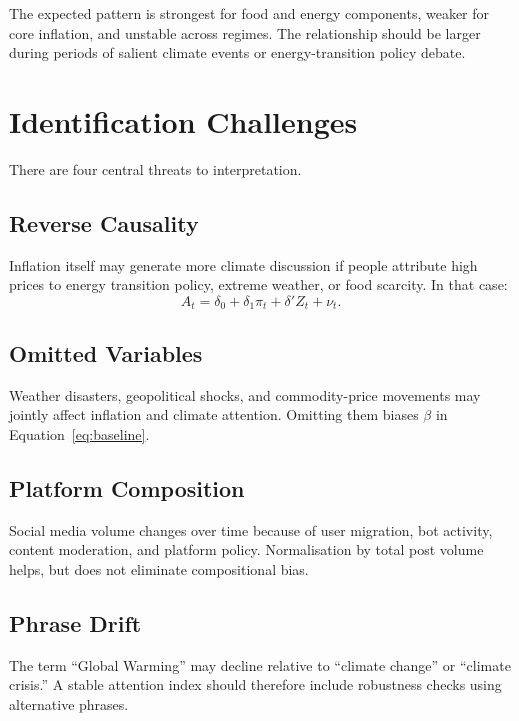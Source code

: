 \documentclass[12pt]{article}
\begin{document}
The expected pattern is strongest for food and energy components, weaker for core inflation, and unstable across regimes. The relationship should be larger during periods of salient climate events or energy-transition policy debate.

\section{Identification Challenges}

There are four central threats to interpretation.

\subsection{Reverse Causality}

Inflation itself may generate more climate discussion if people attribute high prices to energy transition policy, extreme weather, or food scarcity. In that case:
\begin{equation}
    A_t = \delta_0 + \delta_1 \pi_t + \delta'Z_t + \nu_t.
\end{equation}

\subsection{Omitted Variables}

Weather disasters, geopolitical shocks, and commodity-price movements may jointly affect inflation and climate attention. Omitting them biases $\beta$ in Equation~\ref{eq:baseline}.

\subsection{Platform Composition}

Social media volume changes over time because of user migration, bot activity, content moderation, and platform policy. Normalisation by total post volume helps, but does not eliminate compositional bias.

\subsection{Phrase Drift}

The term ``Global Warming'' may decline relative to ``climate change'' or ``climate crisis.'' A stable attention index should therefore include robustness checks using alternative phrases.
\end{document}
